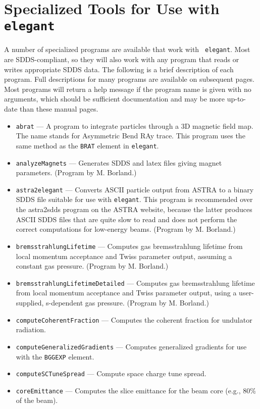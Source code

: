 \documentclass[11pt]{article}
\begin{document}
\newpage
\section{Specialized Tools for Use with {\tt elegant}}

A number of specialized programs are available that work with {\tt
elegant}. Most are SDDS-compliant, so they will also work with any
program that reads or writes appropriate SDDS data.  The following is
a brief description of each program.  Full descriptions for many programs are available
on subsequent pages.  Most programs will return a help message if the program name is
given with no arguments, which should be sufficient documentation and may be more
up-to-date than these manual pages.
\begin{itemize}
\item {\tt abrat} --- A program to integrate particles through a 3D magnetic field map. The name 
 stands for Asymmetric Bend RAy trace. This program uses the same method as the \verb|BRAT|
 element in {\tt elegant}.
\item {\tt analyzeMagnets} --- Generates SDDS and latex files giving magnet parameters.
  (Program by M. Borland.)
\item {\tt astra2elegant} --- Converts ASCII particle output from ASTRA \cite{ASTRA} to a binary
  SDDS file suitable for use with {\tt elegant}.  This program is recommended over
  the astra2sdds program on the ASTRA website, because the latter produces ASCII SDDS
  files that are quite slow to read and does not perform the correct computations
  for low-energy beams.
  (Program by M. Borland.)
\item {\tt bremsstrahlungLifetime} --- Computes gas bremsstrahlung lifetime from local momentum acceptance and Twiss parameter output,
  assuming a constant gas pressure.
  (Program by M. Borland.)
\item {\tt bremsstrahlungLifetimeDetailed} --- Computes gas bremsstrahlung lifetime from local momentum acceptance and Twiss 
  parameter output, using a user-supplied, s-dependent gas pressure.
  (Program by M. Borland.)
\item {\tt computeCoherentFraction} --- Computes the coherent fraction for undulator radiation.
\item {\tt computeGeneralizedGradients} --- Computes generalized gradients for use with the \verb|BGGEXP| element.
\item {\tt computeSCTuneSpread} --- Compute space charge tune spread.
\item {\tt coreEmittance} --- Computes the slice emittance for the beam core (e.g., 80\% of the beam).

\end{itemize}
\end{document}
